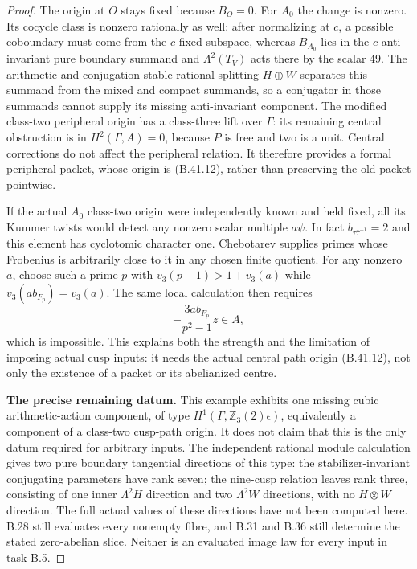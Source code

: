 \begin{proof}
The origin at $O$ stays fixed because $B_O=0$.  For $A_0$
the change is nonzero.  Its cocycle class is nonzero
rationally as well: after normalizing at $c$, a possible
coboundary must come from the $c$-fixed subspace, whereas
$B_{A_0}$ lies in the $c$-anti-invariant pure boundary
summand and $\Lambda^2(T_V)$ acts there by the scalar $49$.
The arithmetic and conjugation stable rational splitting
$H\oplus W$ separates this summand from the mixed and
compact summands, so a conjugator in those summands cannot
supply its missing anti-invariant component.
The modified class-two peripheral origin has a class-three
lift over $\Gamma$: its remaining central obstruction is
in $H^2(\Gamma,A)=0$, because $P$ is free and two is a unit.
Central corrections do not affect the peripheral relation.
It therefore provides a formal peripheral packet, whose
origin is (B.41.12), rather than preserving the old packet
pointwise.

If the actual $A_0$ class-two origin were independently
known and held fixed, all its Kummer twists would detect
any nonzero scalar multiple $a\psi$.  In fact
$b_{\tau\bar\tau^{-1}}=2$ and this element has cyclotomic
character one.  Chebotarev supplies primes whose Frobenius
is arbitrarily close to it in any chosen finite quotient.
For any nonzero $a$, choose such a prime $p$ with
$v_3(p-1)>1+v_3(a)$ while
$v_3(ab_{F_p})=v_3(a)$.  The same local calculation then
requires
\[
 -\frac{3ab_{F_p}}{p^2-1}z\in A,
\]
which is impossible.  This explains both the strength and
the limitation of imposing actual cusp inputs: it needs
the actual central path origin (B.41.12), not only the
existence of a packet or its abelianized centre.

\par\smallskip\noindent\textbf{The precise remaining datum.}\enspace
This example exhibits one missing cubic arithmetic-action
component, of type $H^1(\Gamma,\mathbb Z_3(2)\epsilon)$,
equivalently a component of a class-two cusp-path origin.
It does not claim that this is the only datum required
for arbitrary inputs.  The independent rational module
calculation gives two pure boundary tangential directions
of this type: the stabilizer-invariant conjugating
parameters have rank seven; the nine-cusp relation leaves
rank three, consisting of one inner $\Lambda^2H$ direction
and two $\Lambda^2W$ directions, with no $H\otimes W$
direction.  The full actual values of these directions
have not been computed here.  B.28 still evaluates every
nonempty fibre, and B.31 and B.36 still determine the
stated zero-abelian slice.  Neither is an evaluated image
law for every input in task B.5.

\end{proof}
